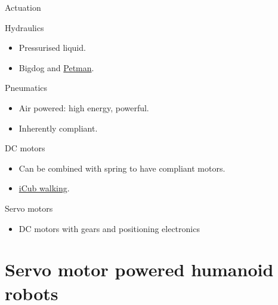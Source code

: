 \documentclass[compress]{beamer}
\begin{document}
\begin{frame}{Actuation}

    Hydraulics

    \begin{itemize}

        \item Pressurised liquid.
        \item Bigdog and \href{http://www.youtube.com/watch?v=QRbvNL1PHKg}{Petman}.
    \end{itemize}

    Pneumatics

    \begin{itemize}

        \item Air powered: high energy, powerful.
        \item Inherently compliant.
    \end{itemize}

    DC motors

    \begin{itemize}

        \item Can be combined with spring to have compliant motors.
        \item \href{http://www.youtube.com/watch?v=XVYsqv3sLew}{iCub walking}.
    \end{itemize}

    Servo motors

    \begin{itemize}

        \item DC motors with gears and positioning electronics
    \end{itemize}

\end{frame}

\section{Servo motor powered humanoid robots}
\end{document}
